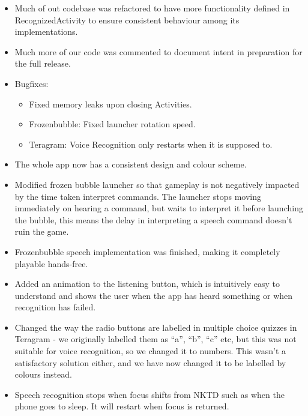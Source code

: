 \documentclass[11pt, oneside]{article}
\begin{document}
\begin{itemize}

\item Much of out codebase was refactored to have more functionality
  defined in RecognizedActivity to ensure consistent behaviour among
  its implementations.

\item Much more of our code was commented to document intent in
  preparation for the full release.

\item Bugfixes:
\begin{itemize}
	\item Fixed memory leaks upon closing Activities.
	\item Frozenbubble: Fixed launcher rotation speed.
	\item Teragram: Voice Recognition only restarts when it is
          supposed to.
\end{itemize}

\item The whole app now has a consistent design and colour scheme.

\item Modified frozen bubble launcher so that gameplay is not
  negatively impacted by the time taken interpret commands. The
  launcher stops moving immediately on hearing a command, but waits to
  interpret it before launching the bubble, this means the delay in
  interpreting a speech command doesn't ruin the game.

\item Frozenbubble speech implementation was finished, making it
  completely playable hands-free.

\item Added an animation to the listening button, which is intuitively
  easy to understand and shows the user when the app has heard
  something or when recognition has failed.

\item Changed the way the radio buttons are labelled in multiple
  choice quizzes in Teragram - we originally labelled them as ``a'',
  ``b'', ``c'' etc, but this was not suitable for voice recognition,
  so we changed it to numbers. This wasn't a satisfactory solution
  either, and we have now changed it to be labelled by colours
  instead.

\item Speech recognition stops when focus shifts from NKTD such as
  when the phone goes to sleep. It will restart when focus is returned.
\end{itemize}
\end{document}
